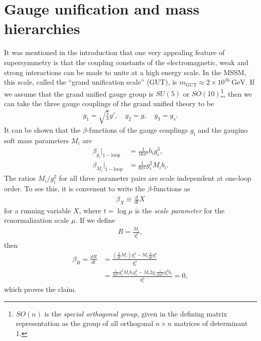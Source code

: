 \documentclass[twoside,english]{uiofysmaster}
\begin{document}
 \section{Gauge unification and mass hierarchies}
 It was mentioned in the introduction that one very appealing feature of supersymmetry is that the coupling constants of the electromagnetic, weak and strong interactions can be made to unite at a high energy scale. In the MSSM, this scale, called the ``grand unification scale'' (GUT), is $m_\mathrm{GUT} \approx 2\times 10^{16} ~\mathrm{GeV}$. If we assume that the grand unified gauge group is $SU(5)$ or $SO(10)$\footnote{$SO(n)$ is the {\it special orthogonal group}, given in the defining matrix representation as the group of all orthogonal $n\times n$ matrices of determinant 1.}, then we can take the three gauge couplings of the grand unified theory to be \cite{Batzing:2013}
 \begin{align}
 	g_1 = \sqrt{\frac{5}{3}}g', \quad g_2 = g, \quad g_3 = g_s.
 \end{align}
 It can be shown that the $\beta$-functions of the gauge couplings $g_i$ and the gaugino soft mass parameters $M_i$ are
 \begin{align}
 	\beta_{g_i}|_\mathrm{1-loop} &= \frac{1}{16\pi^2} b_i g_i^3,\\
 	\beta_{M_i} |_\mathrm{1-loop} &= \frac{1}{8\pi^2}g_i^2 M_i b_i.
 \end{align}
The ratios $M_i/g_i^2$ for all three parameter pairs are scale independent at one-loop order. To see this, it is convenent to write the $\beta$-functions as 
 \begin{align}
 	\beta_X \equiv \frac{d}{dt}X
 \end{align}
 for a running variable $X$, where $t = \log \mu$ is the {\it scale parameter} for the renormalization scale $\mu$. If we define
 \begin{align}
 	R = \frac{M_i}{g_i^2},
 \end{align}
 then
 \begin{align}
 	\beta_R = \frac{dR}{dt} &= \frac{(\frac{d}{dt}M_i)g_i^2 - M_i\frac{d}{dt}g_i^2}{g_i^4} \\
 	&= \frac{\frac{1}{8\pi^2}g_i^2M_i b_i g_i^2 - M_i 2g_i \frac{1}{16\pi^2}g_i^3 b_i}{g_i^4} = 0, \nonumber
 \end{align}
 which proves the claim. 
\end{document}
